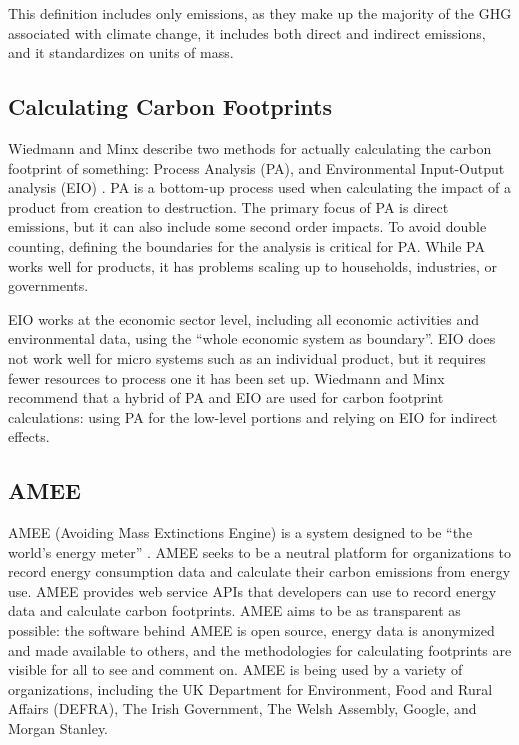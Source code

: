 This definition includes only \COtwo emissions, as they make up the majority of the GHG associated with climate change, it includes both direct and indirect emissions, and it standardizes on units of mass.

\subsection{Calculating Carbon Footprints}

Wiedmann and Minx describe two methods for actually calculating the carbon footprint of something: Process Analysis (PA), and Environmental Input-Output analysis (EIO) \cite{Wiedmann2007carbon-footprint}. PA is a bottom-up process used when calculating the impact of a product from creation to destruction. The primary focus of PA is direct emissions, but it can also include some second order impacts. To avoid double counting, defining the boundaries for the analysis is critical for PA. While PA works well for products, it has problems scaling up to households, industries, or governments. 

EIO works at the economic sector level, including all economic activities and environmental data, using the ``whole economic system as boundary''. EIO does not work well for micro systems such as an individual product, but it requires fewer resources to process one it has been set up. Wiedmann and Minx recommend that a hybrid of PA and EIO are used for carbon footprint calculations: using PA for the low-level portions and relying on EIO for indirect effects.

\subsection{AMEE}
\label{amee}

AMEE (Avoiding Mass Extinctions Engine) is a system designed to be ``the world's energy meter'' \cite{AMEE-website}. AMEE seeks to be a neutral platform for organizations to record energy consumption data and calculate their carbon emissions from energy use. AMEE provides web service APIs that developers can use to record energy data and calculate carbon footprints. AMEE aims to be as transparent as possible: the software behind AMEE is open source, energy data is anonymized and made available to others, and the methodologies for calculating footprints are visible for all to see and comment on. AMEE is being used by a variety of organizations, including the UK Department for Environment, Food and Rural Affairs (DEFRA), The Irish Government, The Welsh Assembly, Google, and Morgan Stanley.


